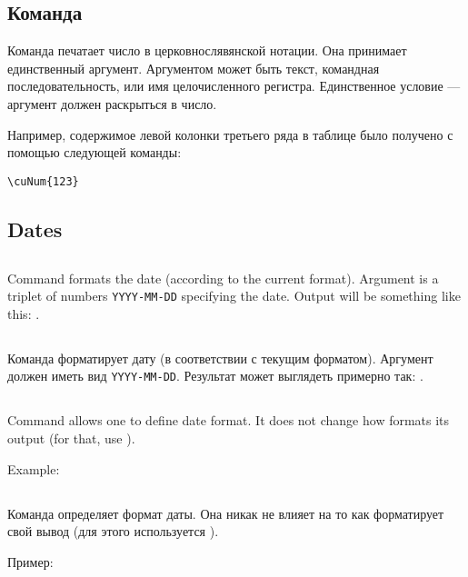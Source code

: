 \begin{RU}
\subsection{Команда }
Команда печатает число в церковнослявянской нотации.
Она принимает единственный аргумент. Аргументом может быть текст, командная последовательность, или имя 
целочисленного регистра. Единственное условие --- аргумент должен раскрыться в число.

Например, содержимое левой колонки третьего ряда в таблице было получено с помощью
следующей команды:
\begin{verbatim}
\cuNum{123}
\end{verbatim}
\end{RU}

\begin{EN}
\section{Dates}
\subsection{}
Command formats the date (according to the current format). Argument is a triplet of numbers \texttt{YYYY-MM-DD} specifying
the date. Output will be something like this: .
\end{EN}

\begin{RU}
\subsection{}
Команда форматирует дату (в соответствии с текущим форматом). Аргумент должен иметь вид \texttt{YYYY-MM-DD}. Результат
может выглядеть примерно так: .
\end{RU}

\begin{EN}
\subsection{}
Command allows one to define date format. It does not change how  formats its output (for that, use ).

Example:
\end{EN}

\begin{RU}
\subsection{}
Команда определяет формат даты. Она никак не влияет на то как  форматирует свой вывод (для этого используется ).

Пример:
\end{RU}

